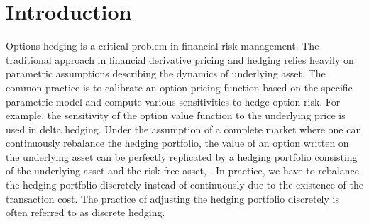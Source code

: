 \documentclass[letterpaper,12pt,titlepage,oneside,final]{book}
\numberwithin{equation}{section}
\theoremstyle{definition}
\begin{document}


\chapter{Introduction}
Options hedging is a critical problem in financial risk management. The traditional approach in financial derivative pricing and hedging relies heavily on parametric assumptions describing the dynamics of underlying asset.  The common practice is to calibrate an option pricing function based on the specific parametric model and compute various sensitivities to hedge option risk. For example, the sensitivity of the option value function to the underlying price is used in delta hedging. Under the assumption of a complete market \cite{shreve2004stochastic} where one can continuously rebalance the hedging portfolio, the value of an option written on the underlying asset can be perfectly replicated by a hedging portfolio consisting of the underlying asset and the  risk-free asset, .  In practice, we have to rebalance the hedging portfolio discretely instead of continuously due to the existence of the transaction cost.  The practice of adjusting the hedging portfolio discretely is often referred to as discrete hedging.
\end{document}

